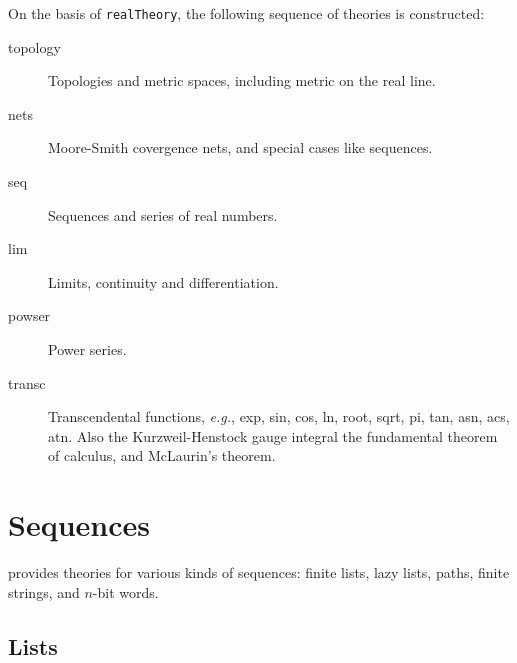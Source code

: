 On the basis of {\small\verb+realTheory+}, the following  sequence of
theories is constructed:

\begin{description}
\item [topology] Topologies and metric spaces, including metric on
the real line.
\item [nets] Moore-Smith covergence nets, and special cases like
sequences.
\item [seq] Sequences and series of real numbers.
\item [lim] Limits, continuity and differentiation.
\item [powser] Power series.
\item [transc] Transcendental functions, \emph{e.g.}, exp, sin,
cos, ln, root, sqrt, pi, tan, asn, acs, atn. Also the Kurzweil-Henstock
gauge integral the fundamental theorem of calculus, and McLaurin's
theorem.

\end{description}

\section{Sequences}

\HOL{} provides theories for various kinds of sequences: finite lists, lazy lists,
paths, finite strings, and $n$-bit words.

\subsection{Lists}\label{avra_list}

